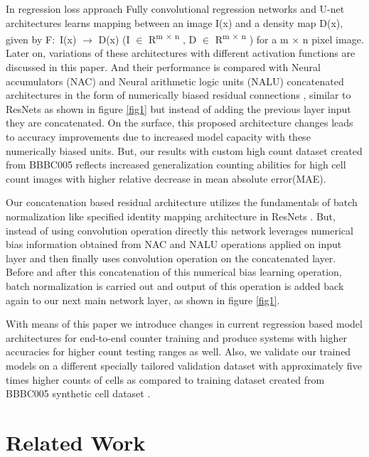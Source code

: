 \documentclass[conference]{IEEEtran}
\begin{document}
In regression loss approach Fully convolutional regression networks \cite{b2} and U-net \cite{b8} architectures learns mapping  between an image I(x) and a density map D(x), given by F$\colon$ I(x) $\rightarrow$ D(x) (I $\in$ R\textsuperscript{m $\times$ n} , D $\in$ R\textsuperscript{m $\times$ n} ) for a m $\times$ n pixel image. Later on, variations of these architectures with different activation functions are discussed in this paper. And their performance is compared with Neural accumulators (NAC) and Neural arithmetic logic units (NALU) concatenated architectures in the form of numerically biased residual connections , similar to ResNets \cite{b9} as shown in figure \ref{fig1} but instead of adding the previous layer input they are concatenated. On the surface, this proposed architecture changes leads to accuracy improvements due to increased model capacity with these numerically biased units. But, our results with custom high count dataset created from BBBC005 \cite{b29} reflects increased generalization counting abilities for high cell count images with higher relative decrease in mean absolute error(MAE).

Our concatenation based residual architecture utilizes the fundamentals of batch normalization like specified identity mapping architecture in ResNets \cite{b17}. But, instead of using convolution operation directly this network leverages numerical bias information obtained from NAC and NALU operations applied on input layer and then finally uses convolution operation on the concatenated layer. Before and after this concatenation of this numerical bias learning operation, batch normalization is carried out and output of this operation is added back again to our next main network layer, as shown in figure  \ref{fig1}.

With means of this paper we introduce changes in current regression based model architectures for end-to-end counter training and produce systems with higher accuracies for higher count testing ranges as well. Also, we validate our trained models on a different specially tailored validation dataset with approximately five times higher counts of cells as compared to training dataset created from BBBC005 synthetic cell dataset \cite{b29}.

\section{Related Work}
\end{document}
